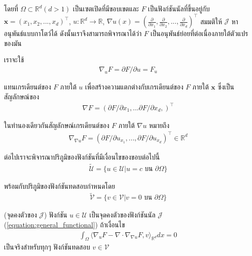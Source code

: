 โดยที่ $\Omega \subset \mathbb{R}^{d} (d>1)$ เป็นเซตเปิดที่มีขอบเขตและ $F$ เป็นฟังก์ชันนัลที่ขึ้นอยู่กับ $\boldsymbol{x}=(x_1,x_2,...,x_d)^\top$, $u: \mathbb{R}^{d} \rightarrow \mathbb{R}$, $\nabla u (x) = ( \frac{\partial}{\partial x_1},\frac{\partial}{\partial x_2}, ... , \frac{\partial}{\partial x_d} )^\top$ สมมติให้ $\mathcal{J}$ หาอนุพันธ์แบบกาโตว์ได้ ดังนั้นเราจึงสามารถพิจารณาได้ว่า $F$ เป็นอนุพันธ์ย่อยที่ต่อเนื่องภายใต้ตัวแปรของมัน

\hspace{1cm} เราจะใช้
\begin{align}
    \nabla_{u} F = \partial F / \partial u = F_u
\end{align}

แทนเกรเดียนต์ของ $F$ ภายใต้ $u$ เพื่อสร้างความแตกต่างกับเกรเดียนต์ของ $F$ ภายใต้ $\boldsymbol{x}$ ซึ่งเป็นสัญลักษณ์ของ
\begin{align}
    \nabla F = (\partial F / \partial x_1, ... \partial F / \partial x_d, )^\top
\end{align}

ในทำนองเดียวกันสัญลักษณ์เกรเดียนต์ของ $F$ ภายใต้ $\nabla u$ หมายถึง
\begin{align}
    \nabla_{\nabla u} F = (\partial F / \partial u_{x_1},..., \partial F / \partial u_{x_d})^\top \in \mathbb{R}^d
\end{align}

\hspace{1cm}ต่อไปเราจะพิจารณาปริภูมิของฟังก์ชันที่มีเงื่อนไขของขอบต่อไปนี้
\begin{align}
    \tilde{\mathcal{U}} = \{u \in \mathcal{U} | u = c \text{ บน } \partial \Omega \}
\end{align}

พร้อมกับปริภูมิของฟังก์ชันทดสอบกำหนดโดย
\begin{align}
    \tilde{\mathcal{V}} = \{v \in \mathcal{V} | v = 0 \text{ บน } \partial \Omega \}
\end{align}

\begin{Lemma}
    (จุดคงตัวของ $\mathcal{J}$) ฟังก์ชัน $u \in \mathcal{U}$ เป็นจุดคงตัวของฟังก์ชันนัล $\mathcal{J}$ (\ref{equation:general_functional}) ถ้าเงื่อนไข
    \begin{align}
        \int_{\Omega} \Big \langle \nabla_u F - \nabla \cdot \nabla_{\nabla u} F,v \Big \rangle_{\mathbb{R}^{d}} dx = 0
        \label{equation:lemma_stationarypoint}
    \end{align}
    \label{lemma:stationary_point}
    เป็นจริงสำหรับทุกๆ ฟังก์ชันทดสอบ $v \in \mathcal{V}$
\end{Lemma}

